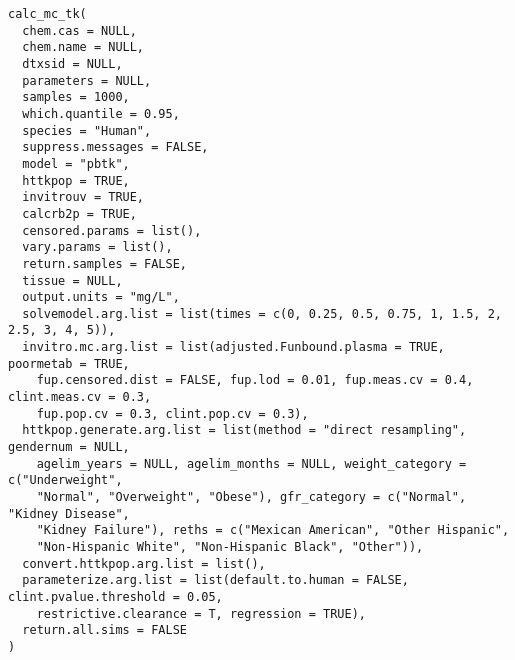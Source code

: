 \documentclass[a4paper]{book}
\begin{document}
\begin{Usage}
\begin{verbatim}
calc_mc_tk(
  chem.cas = NULL,
  chem.name = NULL,
  dtxsid = NULL,
  parameters = NULL,
  samples = 1000,
  which.quantile = 0.95,
  species = "Human",
  suppress.messages = FALSE,
  model = "pbtk",
  httkpop = TRUE,
  invitrouv = TRUE,
  calcrb2p = TRUE,
  censored.params = list(),
  vary.params = list(),
  return.samples = FALSE,
  tissue = NULL,
  output.units = "mg/L",
  solvemodel.arg.list = list(times = c(0, 0.25, 0.5, 0.75, 1, 1.5, 2, 2.5, 3, 4, 5)),
  invitro.mc.arg.list = list(adjusted.Funbound.plasma = TRUE, poormetab = TRUE,
    fup.censored.dist = FALSE, fup.lod = 0.01, fup.meas.cv = 0.4, clint.meas.cv = 0.3,
    fup.pop.cv = 0.3, clint.pop.cv = 0.3),
  httkpop.generate.arg.list = list(method = "direct resampling", gendernum = NULL,
    agelim_years = NULL, agelim_months = NULL, weight_category = c("Underweight",
    "Normal", "Overweight", "Obese"), gfr_category = c("Normal", "Kidney Disease",
    "Kidney Failure"), reths = c("Mexican American", "Other Hispanic",
    "Non-Hispanic White", "Non-Hispanic Black", "Other")),
  convert.httkpop.arg.list = list(),
  parameterize.arg.list = list(default.to.human = FALSE, clint.pvalue.threshold = 0.05,
    restrictive.clearance = T, regression = TRUE),
  return.all.sims = FALSE
)
\end{verbatim}
\end{Usage}
%
\end{document}
